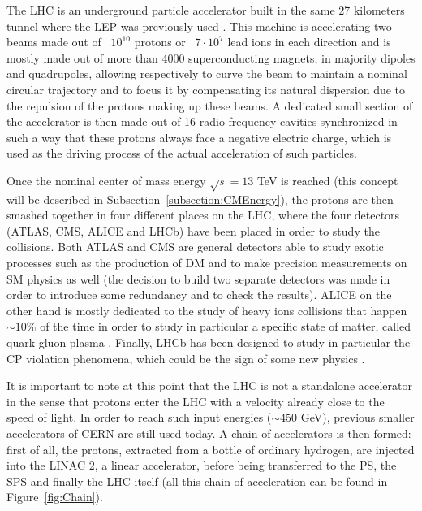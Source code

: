 \documentclass[a4paper, 10pt, openright]{report}
\begin{document}
The \ac{LHC} is an underground particle accelerator built in the same 27 kilometers tunnel where the \ac{LEP} was previously used \cite{LEP}. This machine is accelerating two beams made out of ~$10^{10}$ protons or ~$7\cdot10^{7}$ lead ions in each direction and is mostly made out of more than 4000 superconducting magnets, in majority dipoles and quadrupoles, allowing respectively to curve the beam to maintain a nominal circular trajectory and to focus it by compensating its natural dispersion due to the repulsion of the protons making up these beams. A dedicated small section of the accelerator is then made out of 16 radio-frequency cavities synchronized in such a way that these protons always face a negative electric charge, which is used as the driving process of the actual acceleration of such particles.

Once the nominal center of mass energy $\sqrt{s} = 13$ TeV is reached (this concept will be described in Subsection~\ref{subsection:CMEnergy}), the protons are then smashed together in four different places on the \ac{LHC}, where the four detectors (\ac{ATLAS}, \ac{CMS}, \ac{ALICE} and LHCb) have been placed in order to study the collisions. Both \ac{ATLAS} and \ac{CMS} are general detectors able to study exotic processes such as the production of \ac{DM} and to make precision measurements on \ac{SM} physics as well (the decision to build two separate detectors was made in order to introduce some redundancy and to check the results). \ac{ALICE} on the other hand is mostly dedicated to the study of heavy ions collisions that happen $\sim 10$\% of the time in order to study in particular a specific state of matter, called quark-gluon plasma \cite{ALICE}. Finally, LHCb has been designed to study in particular the CP violation phenomena, which could be the sign of some new physics \cite{LHCb}.

It is important to note at this point that the \ac{LHC} is not a standalone accelerator in the sense that protons enter the \ac{LHC} with a velocity already close to the speed of light. In order to reach such input energies ($\sim 450$ GeV), previous smaller accelerators of \ac{CERN} are still used today. A chain of accelerators is then formed: first of all, the protons, extracted from a bottle of ordinary hydrogen, are injected into the LINAC 2, a linear accelerator, before being transferred to the \ac{PS}, the \ac{SPS} and finally the \ac{LHC} itself (all this chain of acceleration can be found in Figure~\ref{fig:Chain}).
\end{document}
